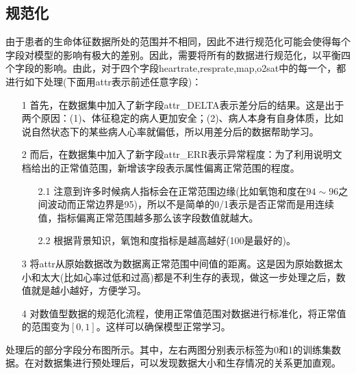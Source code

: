 \documentclass[UTF8]{article}
\begin{document}
\subsection{规范化}
由于患者的生命体征数据所处的范围并不相同，因此不进行规范化可能会使得每个字段对模型的影响有极大的差别。因此，需要将所有的数据进行规范化，以平衡四个字段的影响。由此，对于四个字段heartrate,resprate,map,o2sat中的每一个，都进行如下处理(下面用attr表示前述任意字段)：

\begin{enumerate}
    \item[1] 首先，在数据集中加入了新字段attr\_DELTA表示差分后的结果。这是出于两个原因：(1)、体征稳定的病人更加安全；(2)、病人本身有自身体质，比如说自然状态下的某些病人心率就偏低，所以用差分后的数据帮助学习。
    \item[2] 而后，在数据集中加入了新字段attr\_ERR表示异常程度：为了利用说明文档给出的正常值范围，新增该字段表示属性偏离正常范围的程度。
        \begin{enumerate}
            \item[2.1] 注意到许多时候病人指标会在正常范围边缘(比如氧饱和度在$94\sim96$之间波动而正常边界是95)，所以不是简单的0/1表示是否正常而是用连续值，指标偏离正常范围越多那么该字段数值就越大。
            \item[2.2] 根据背景知识，氧饱和度指标是越高越好(100是最好的)。
        \end{enumerate}
    \item[3] 将attr从原始数据改为数据离正常范围中间值的距离。这是因为原始数据太小和太大(比如心率过低和过高)都是不利生存的表现，做这一步处理之后，数值就是越小越好，方便学习。
    \item[4] 对数值型数据的规范化流程，使用正常值范围对数据进行标准化，将正常值的范围变为$[0,1]$。这样可以确保模型正常学习。
\end{enumerate}

处理后的部分字段分布图所示。其中，左右两图分别表示标签为0和1的训练集数据。在对数据集进行预处理后，可以发现数据大小和生存情况的关系更加直观。
\end{document}
